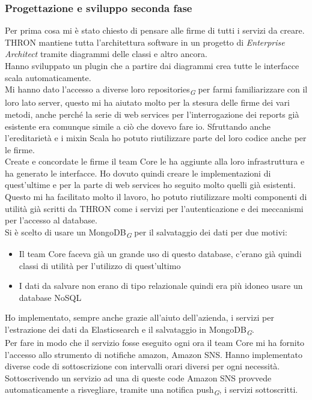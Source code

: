 \documentclass[a4paper, 12pt, twoside, openright]{book}
\newcommand{\gloss}[1]{#1\textsubscript{\textit{\tiny{G}}}}
\begin{document}
\subsubsection{Progettazione e sviluppo seconda fase}
Per prima cosa mi è stato chiesto di pensare alle firme di tutti i servizi da creare. THRON mantiene tutta l'architettura software in un progetto di \textit{Enterprise Architect} tramite diagrammi delle classi e altro ancora.\\
Hanno sviluppato un plugin che a partire dai diagrammi crea tutte le interfacce scala automaticamente.\\
Mi hanno dato l'accesso a diverse loro \gloss{repositories} per farmi familiarizzare con il loro lato server, questo mi ha aiutato molto per la stesura delle firme dei vari metodi, anche perché la serie di web services per l'interrogazione dei reports già esistente era comunque simile a ciò che dovevo fare io. Sfruttando anche l'ereditarietà e i mixin Scala ho potuto riutilizzare parte del loro codice anche per le firme.\\
Create e concordate le firme il team Core le ha aggiunte alla loro infrastruttura e ha generato le interfacce. Ho dovuto quindi creare le implementazioni di quest'ultime e per la parte di web services ho seguito molto quelli già esistenti. Questo mi ha facilitato molto il lavoro, ho potuto riutilizzare molti componenti di utilità già scritti da THRON come i servizi per l'autenticazione e dei meccanismi per l'accesso al database.\\
Si è scelto di usare un \gloss{MongoDB} per il salvataggio dei dati per due motivi:
\begin{itemize}
	\item Il team Core faceva già un grande uso di questo database, c'erano già quindi classi di utilità per l'utilizzo di quest'ultimo
	\item I dati da salvare non erano di tipo relazionale quindi era più idoneo usare un database NoSQL
\end{itemize}
Ho implementato, sempre anche grazie all'aiuto dell'azienda, i servizi per l'estrazione dei dati da Elasticsearch e il salvataggio in \gloss{MongoDB}.\\
Per fare in modo che il servizio fosse eseguito ogni ora il team Core mi ha fornito l'accesso allo strumento di notifiche amazon, Amazon SNS. Hanno implementato diverse code di sottoscrizione con intervalli orari diversi per ogni necessità. Sottoscrivendo un servizio ad una di queste code Amazon SNS provvede automaticamente a risvegliare, tramite una \gloss{notifica push}, i servizi sottoscritti.\\
\end{document}
